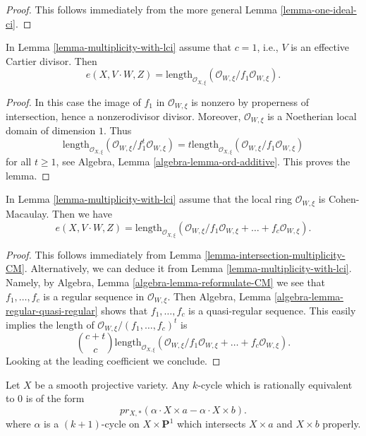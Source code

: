 \begin{proof}
This follows immediately from the more general
Lemma \ref{lemma-one-ideal-ci}.
\end{proof}

\begin{lemma}
\label{lemma-multiplicity-with-effective-Cartier-divisor}
In Lemma \ref{lemma-multiplicity-with-lci} assume that  $c = 1$, i.e., $V$
is an effective Cartier divisor. Then
$$
e(X, V \cdot W, Z) =
\text{length}_{\mathcal{O}_{X, \xi}}
(\mathcal{O}_{W, \xi}/f_1\mathcal{O}_{W, \xi}).
$$
\end{lemma}

\begin{proof}
In this case the image of $f_1$ in $\mathcal{O}_{W, \xi}$ is nonzero by
properness of intersection, hence a nonzerodivisor divisor. Moreover,
$\mathcal{O}_{W, \xi}$ is a Noetherian local domain of dimension $1$.
Thus
$$
\text{length}_{\mathcal{O}_{X, \xi}}
(\mathcal{O}_{W, \xi}/f_1^t\mathcal{O}_{W, \xi}) =
t \text{length}_{\mathcal{O}_{X, \xi}}
(\mathcal{O}_{W, \xi}/f_1\mathcal{O}_{W, \xi})
$$
for all $t \geq 1$, see Algebra, Lemma \ref{algebra-lemma-ord-additive}.
This proves the lemma.
\end{proof}

\begin{lemma}
\label{lemma-multiplicity-lci-CM}
In Lemma \ref{lemma-multiplicity-with-lci} assume that
the local ring $\mathcal{O}_{W, \xi}$ is Cohen-Macaulay. Then we
have
$$
e(X, V \cdot W, Z) =
\text{length}_{\mathcal{O}_{X, \xi}} (\mathcal{O}_{W, \xi}/
f_1\mathcal{O}_{W, \xi} + \ldots + f_c\mathcal{O}_{W, \xi}).
$$
\end{lemma}

\begin{proof}
This follows immediately from Lemma \ref{lemma-intersection-multiplicity-CM}.
Alternatively, we can deduce it from Lemma \ref{lemma-multiplicity-with-lci}.
Namely, by Algebra, Lemma \ref{algebra-lemma-reformulate-CM}
we see that $f_1, \ldots, f_c$ is a regular sequence in
$\mathcal{O}_{W, \xi}$. Then
Algebra, Lemma \ref{algebra-lemma-regular-quasi-regular} shows that
$f_1, \ldots, f_c$ is a quasi-regular sequence.
This easily implies the length of
$\mathcal{O}_{W, \xi}/(f_1, \ldots, f_c)^t$ is
$$
{c + t \choose c}
\text{length}_{\mathcal{O}_{X, \xi}} (\mathcal{O}_{W, \xi}/
f_1\mathcal{O}_{W, \xi} + \ldots + f_c\mathcal{O}_{W, \xi}).
$$
Looking at the leading coefficient we conclude.
\end{proof}

\begin{lemma}
\label{lemma-rational-equivalence-and-intersection}
Let $X$ be a smooth projective variety. Any $k$-cycle which is
rationally equivalent to $0$ is of the form
$$
pr_{X,*}( \alpha \cdot X \times a - \alpha \cdot X \times b).
$$
where $\alpha$ is a $(k + 1)$-cycle on $X \times \mathbf{P}^1$
which intersects $X \times a$ and $X \times b$ properly.
\end{lemma}

